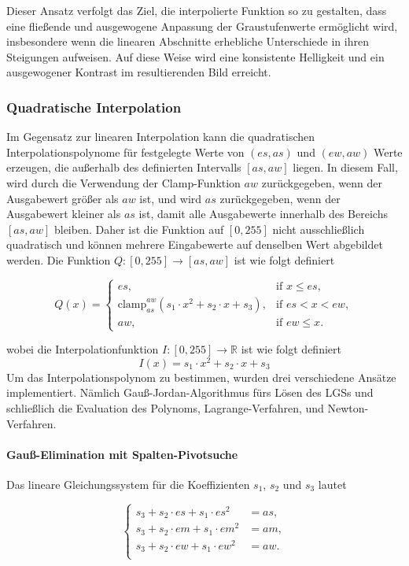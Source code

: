 \documentclass[course=erap]{aspdoc}
\newcommand{\clamp}[3]{\text{clamp}^{#1} _{#2} (#3)}
\begin{document}
Dieser Ansatz verfolgt das Ziel, die interpolierte Funktion so zu gestalten, dass eine fließende und ausgewogene Anpassung der Graustufenwerte ermöglicht wird, insbesondere wenn die linearen Abschnitte erhebliche Unterschiede in ihren Steigungen aufweisen. Auf diese Weise wird eine konsistente Helligkeit und ein ausgewogener Kontrast im resultierenden Bild erreicht.

\subsubsection{Quadratische Interpolation}
Im Gegensatz zur linearen Interpolation kann die quadratischen Interpolationspolynome für festgelegte Werte von \((es, as)\) und \((ew, aw)\) Werte erzeugen, die außerhalb des definierten Intervalls \([as, aw]\) liegen. In diesem Fall, wird durch die Verwendung der Clamp-Funktion $aw$ zurückgegeben, wenn der Ausgabewert größer als $aw$ ist, und wird $as$  zurückgegeben, wenn der Ausgabewert kleiner als $as$ ist, damit alle Ausgabewerte innerhalb des Bereichs \([as, aw]\) bleiben. Daher ist die Funktion auf \([0,255]\)  nicht ausschließlich quadratisch und können mehrere Eingabewerte auf denselben Wert abgebildet werden.
Die Funktion \( Q: [0,255] \rightarrow [as, aw] \) ist wie folgt definiert

\[
Q(x) =
\begin{cases}
  es, & \text{if } x \leq es, \\
  \clamp{aw}{as}{s_1 \cdot x^2 + s_2 \cdot x + s_3 }, & \text{if } es < x < ew, \\
  aw, & \text{if } ew \leq x.
\end{cases}
\]

wobei die Interpolationfunktion \( I: [0,255] \rightarrow \mathbb{R} \) ist wie folgt definiert
\[ I(x) = s_1 \cdot x^2 + s_2 \cdot x + s_3 \]
Um das Interpolationspolynom zu bestimmen, wurden drei verschiedene Ansätze implementiert. Nämlich Gauß-Jordan-Algorithmus fürs Lösen des LGSs und schließlich die Evaluation des Polynoms, Lagrange-Verfahren, und Newton-Verfahren.

\paragraph{Gauß-Elimination mit Spalten-Pivotsuche} 
Das lineare Gleichungssystem für die Koeffizienten \(s_1\), \(s_2\) und \(s_3\) lautet

\[
\begin{cases}
s_3 + s_2 \cdot es + s_1 \cdot es^2 &= as, \\
s_3 + s_2 \cdot em + s_1 \cdot em^2 &= am, \\
s_3 + s_2 \cdot ew + s_1 \cdot ew^2 &= aw.\\
\end{cases}
\]
\end{document}
